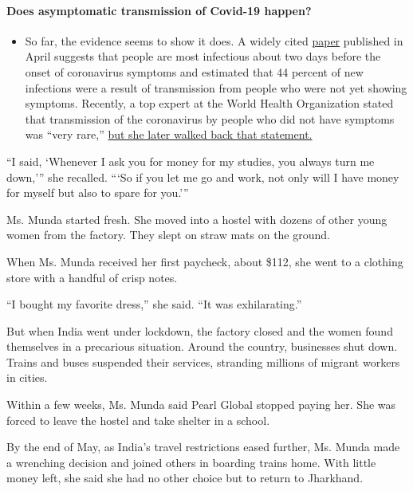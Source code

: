 \begin{itemize}
{  \paragraph{Does asymptomatic transmission of Covid-19
  happen?}\label{does-asymptomatic-transmission-of-covid-19-happen}}

  \begin{itemize}
  \tightlist
  \item
    So far, the evidence seems to show it does. A widely cited
    \href{https://www.nature.com/articles/s41591-020-0869-5}{paper}
    published in April suggests that people are most infectious about
    two days before the onset of coronavirus symptoms and estimated that
    44 percent of new infections were a result of transmission from
    people who were not yet showing symptoms. Recently, a top expert at
    the World Health Organization stated that transmission of the
    coronavirus by people who did not have symptoms was ``very rare,''
    \href{https://www.nytimes.com/2020/06/09/world/coronavirus-updates.html?action=click\&pgtype=Article\&state=default\&region=MAIN_CONTENT_3\&context=storylines_faq\#link-1f302e21}{but
    she later walked back that statement.}
  \end{itemize}
\end{itemize}

``I said, `Whenever I ask you for money for my studies, you always turn
me down,''' she recalled. ```So if you let me go and work, not only will
I have money for myself but also to spare for you.'''

Ms. Munda started fresh. She moved into a hostel with dozens of other
young women from the factory. They slept on straw mats on the ground.

When Ms. Munda received her first paycheck, about \$112, she went to a
clothing store with a handful of crisp notes.

``I bought my favorite dress,'' she said. ``It was exhilarating.''

But when India went under lockdown, the factory closed and the women
found themselves in a precarious situation. Around the country,
businesses shut down. Trains and buses suspended their services,
stranding millions of migrant workers in cities.

Within a few weeks, Ms. Munda said Pearl Global stopped paying her. She
was forced to leave the hostel and take shelter in a school.

By the end of May, as India's travel restrictions eased further, Ms.
Munda made a wrenching decision and joined others in boarding trains
home. With little money left, she said she had no other choice but to
return to Jharkhand.

